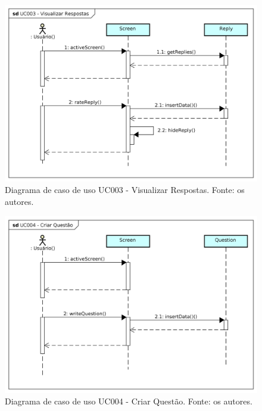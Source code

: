 \begin{figure}[!htb]
\centering
\includegraphics[width=16cm]{UC003-VisualizarRespostas.png}
\caption{Diagrama de caso de uso UC003 - Visualizar Respostas. Fonte: os autores.}
\label{fig:UC003}
\end{figure}

\begin{figure}[!htb]
\centering
\includegraphics[width=16cm]{UC004-CriarQuestao.png}
\caption{Diagrama de caso de uso UC004 - Criar Questão. Fonte: os autores.}
\label{fig:UC004}
\end{figure}

